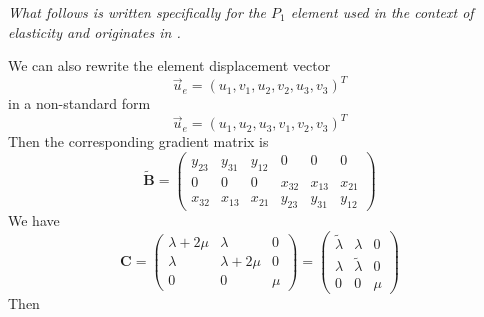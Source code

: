 {\it What follows is written specifically for the $P_1$ element 
used in the context of elasticity and originates in \cite{koko07}.}

We can also rewrite the element displacement vector
\[
\vec{u}_e = (u_1, v_1, u_2, v_2, u_3, v_3)^T
\]
in a non-standard form
\[
\vec{u}_e = (u_1, u_2, u_3, v_1, v_2, v_3)^T
\]
Then the corresponding gradient matrix is 
\[
\tilde{\bm B}=
\begin{pmatrix}
y_{23}  & y_{31}  & y_{12} & 0 & 0 & 0 \\
0 & 0 & 0 & x_{32}  & x_{13}  & x_{21} \\
x_{32} & x_{13} & x_{21} & y_{23} &  y_{31}  & y_{12}
\end{pmatrix}
\]
We have 
\[
{\bm C} =
\begin{pmatrix}
\lambda + 2 \mu & \lambda & 0 \\
\lambda & \lambda + 2 \mu & 0 \\
0 & 0 & \mu
\end{pmatrix}
=
\begin{pmatrix}
\tilde\lambda  & \lambda & 0 \\
\lambda & \tilde\lambda  & 0 \\
0 & 0 & \mu
\end{pmatrix}
\]
Then 



